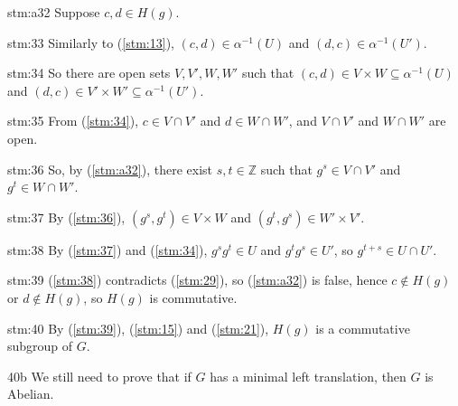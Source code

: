 \begin{statement}{stm:a32}
Suppose $c,d \in H(g)$.
\end{statement}

\begin{statement}{stm:33}
Similarly to (\ref{stm:13}), $(c,d) \in \alpha^{-1}(U)$ and $(d,c) \in \alpha^{-1}(U')$.
\end{statement}

\begin{statement}{stm:34}
So there are open sets $V,V',W,W'$ such that $(c,d) \in V \times W \subseteq \alpha^{-1}(U)$ and $(d,c) \in V' \times W' \subseteq \alpha^{-1}(U')$.
\end{statement}

\begin{statement}{stm:35}
From (\ref{stm:34}), $c \in V \cap V'$ and $d \in W \cap W'$, and $V \cap V'$ and $W \cap W'$ are open.
\end{statement}

\begin{statement}{stm:36}
So, by (\ref{stm:a32}), there exist $s,t \in \mathbb{Z}$ such that $g^s \in V \cap V'$ and $g^t \in W \cap W'$.
\end{statement}

\begin{statement}{stm:37}
By (\ref{stm:36}), $(g^s, g^t) \in V \times W$ and $(g^t, g^s) \in W' \times V'$.
\end{statement}

\begin{statement}{stm:38}
By (\ref{stm:37}) and (\ref{stm:34}), $g^s g^t \in U$ and $g^t g^s \in U'$, so $g^{t+s} \in U \cap U'$.
\end{statement}

\begin{statement}{stm:39}
(\ref{stm:38}) contradicts (\ref{stm:29}), so (\ref{stm:a32}) is false, hence $c \notin H(g)$ or $d \notin H(g)$, so $H(g)$ is commutative.
\end{statement}

\begin{statement}{stm:40}
By (\ref{stm:39}), (\ref{stm:15}) and (\ref{stm:21}), $H(g)$ is a commutative subgroup of $G$.
\end{statement}

\begin{explanation}{40b}
We still need to prove that if $G$ has a minimal left translation, then $G$ is Abelian.
\end{explanation}

